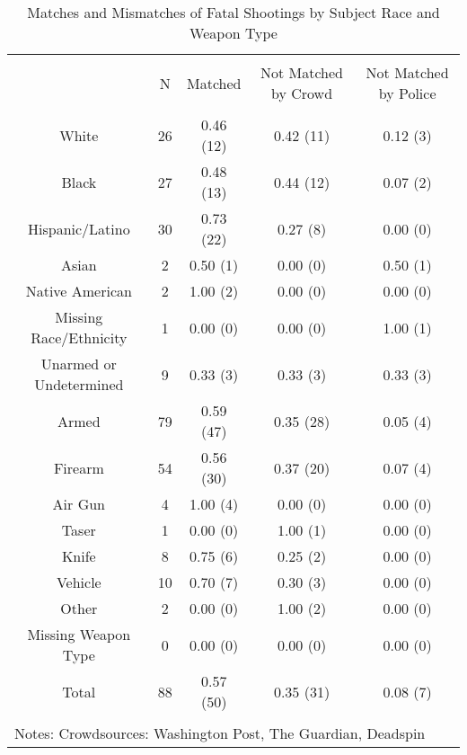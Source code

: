 
\begin{table}[!htbp] \centering 
  \caption{Matches and Mismatches of Fatal Shootings by Subject Race and Weapon Type} 
  \label{} 
\footnotesize 
\begin{tabular}{@{\extracolsep{5pt}} ccccc} 
\\[-1.8ex]\hline 
\hline \\[-1.8ex] 
 & N & Matched & Not Matched by Crowd & Not Matched by Police \\ 
\hline \\[-1.8ex] 
White & 26 & 0.46 (12) & 0.42 (11) & 0.12 (3) \\ 
Black & 27 & 0.48 (13) & 0.44 (12) & 0.07 (2) \\ 
Hispanic/Latino & 30 & 0.73 (22) & 0.27 (8) & 0.00 (0) \\ 
Asian & 2 & 0.50 (1) & 0.00 (0) & 0.50 (1) \\ 
Native American & 2 & 1.00 (2) & 0.00 (0) & 0.00 (0) \\ 
Missing Race/Ethnicity & 1 & 0.00 (0) & 0.00 (0) & 1.00 (1) \\ 
Unarmed or Undetermined & 9 & 0.33 (3) & 0.33 (3) & 0.33 (3) \\ 
Armed & 79 & 0.59 (47) & 0.35 (28) & 0.05 (4) \\ 
Firearm & 54 & 0.56 (30) & 0.37 (20) & 0.07 (4) \\ 
Air Gun & 4 & 1.00 (4) & 0.00 (0) & 0.00 (0) \\ 
Taser & 1 & 0.00 (0) & 1.00 (1) & 0.00 (0) \\ 
Knife & 8 & 0.75 (6) & 0.25 (2) & 0.00 (0) \\ 
Vehicle & 10 & 0.70 (7) & 0.30 (3) & 0.00 (0) \\ 
Other & 2 & 0.00 (0) & 1.00 (2) & 0.00 (0) \\ 
Missing Weapon Type & 0 & 0.00 (0) & 0.00 (0) & 0.00 (0) \\ 
Total & 88 & 0.57 (50) & 0.35 (31) & 0.08 (7) \\ 
\hline \\[-1.8ex] 
\multicolumn{5}{l}{Notes: Crowdsources: Washington Post, The Guardian, Deadspin} \\ 
\end{tabular} 
\end{table}  
